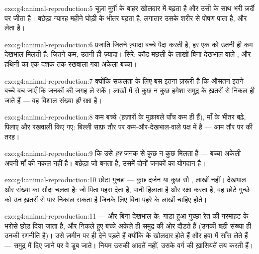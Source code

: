 \begin{solution}{exo:g4:animal-reproduction:5}
चूज़ा मुर्ग़ी के बाहर खोलदार  में बढ़ता है और उसी के साथ भरी ज़र्दी
पर जीता है। बछेड़ा ग्यारह महीने घोड़ी के भीतर बढ़ता है, लगातार उसके
शरीर से पोषण पाता है, और  लेता है।
\end{solution}

\begin{solution}{exo:g4:animal-reproduction:6}
प्रजाति जितने ज़्यादा बच्चे पैदा करती है, हर एक को उतनी ही कम देखभाल
मिलती है; जितने कम, उतनी ही ज़्यादा। सिरे: कॉड मछली के लाखों बिना
देखभाल वाले , और हथिनी का एक दशक तक रखवाला गया अकेला बच्चा।
\end{solution}

\begin{solution}{exo:g4:animal-reproduction:7}
क्योंकि सफलता के लिए बस इतना ज़रूरी है कि औसतन इतने बच्चे बच जाएँ कि
जनकों की जगह ले सकें। लाखों  में से कुछ न कुछ हमेशा समुद्र के
ख़तरों से निकल ही जाते हैं --- वह विशाल संख्या \emph{ही} रक्षा है।
\end{solution}

\begin{solution}{exo:g4:animal-reproduction:8}
कम बच्चे (हज़ारों के मुक़ाबले पाँच कम ही हैं), माँ के भीतर बढ़े, 
पिलाए और रखवाली किए गए: बिल्ली साफ़ तौर पर कम-और-देखभाल-वाले पक्ष में
है --- आम तौर पर  की तरह।
\end{solution}

\begin{solution}{exo:g4:animal-reproduction:9}
कि उसे \emph{हर} जनक से कुछ न कुछ मिलता है --- बच्चा अकेली अपनी माँ की
नक़ल नहीं है। बछेड़ा जो बनता है, उसमें दोनों जनकों का योगदान है।
\end{solution}

\begin{solution}{exo:g4:animal-reproduction:10}
छोटा गुच्छा --- कुछ दर्जन या कुछ सौ , लाखों नहीं। देखभाल और संख्या
का सौदा चलता है: जो पिता पहरा देता है, पानी हिलाता है और रक्षा करता
है, वह छोटे गुच्छे को उन ख़तरों से पार निकाल सकता है जिनके लिए बिना
पहरे के लाखों  चाहिए होते।
\end{solution}

\begin{solution}{exo:g4:animal-reproduction:11}
 --- और बिना देखभाल के: गाड़ा हुआ गुच्छा रेत की गरमाहट के भरोसे
छोड़ दिया जाता है, और निकले हुए बच्चे अकेले ही समुद्र की ओर दौड़ते हैं
(उनकी बड़ी संख्या ही उनकी रणनीति है)। उसे ज़मीन पर ही  देने पड़ते
हैं क्योंकि  के  खोलदार होते हैं और हवा में साँस लेते हैं
--- समुद्र में दिए जाने पर वे डूब जाते। नियम उसकी आदतें नहीं, उसके
वर्ग की ख़ासियतें तय करती हैं।
\end{solution}
